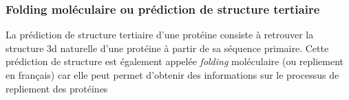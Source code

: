 



\subsubsection{Folding moléculaire ou prédiction de structure tertiaire} 

La prédiction de structure tertiaire d'une protéine consiste à retrouver la structure 3d naturelle d'une protéine à partir de sa séquence primaire. Cette prédiction de structure est également appelée \textit{folding} moléculaire (ou repliement en français) car elle peut permet d'obtenir des informations sur le processus de repliement des protéines 

